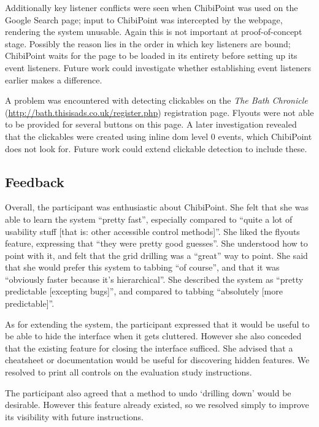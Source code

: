 \documentclass[11pt,openright,a4paper]{report}
\begin{document}
Additionally key listener conflicts were seen when ChibiPoint was used on the Google Search page; input to ChibiPoint was intercepted by the webpage, rendering the system unusable. Again this is not important at proof-of-concept stage. Possibly the reason lies in the order in which key listeners are bound; ChibiPoint waits for the page to be loaded in its entirety before setting up its event listeners. Future work could investigate whether establishing event listeners earlier makes a difference.

A problem was encountered with detecting clickables on the \textit{The Bath Chronicle} (\url{http://bath.thisisads.co.uk/register.php}) registration page. Flyouts were not able to be provided for several buttons on this page. A later investigation revealed that the clickables were created using inline \gls{dom} level 0 events, which ChibiPoint does not look for. Future work could extend clickable detection to include these.

\subsection{Feedback}
\label{sec:usability_feedback}
Overall, the participant was enthusiastic about ChibiPoint. She felt that she was able to learn the system ``pretty fast'', especially compared to ``quite a lot of usability stuff [that is: other accessible control methods]''. She liked the flyouts feature, expressing that ``they were pretty good guesses''. She understood how to point with it, and felt that the grid drilling was a ``great'' way to point. She said that she would prefer this system to tabbing ``of course'', and that it was ``obviously faster because it's hierarchical''. She described the system as ``pretty predictable [excepting bugs]'', and compared to tabbing ``absolutely [more predictable]''.

As for extending the system, the participant expressed that it would be useful to be able to hide the interface when it gets cluttered. However she also conceded that the existing feature for closing the interface sufficed. She advised that a cheatsheet or documentation would be useful for discovering hidden features. We resolved to print all controls on the evaluation study instructions.

The participant also agreed that a method to undo `drilling down' would be desirable. However this feature already existed, so we resolved simply to improve its visibility with future instructions.
\end{document}
